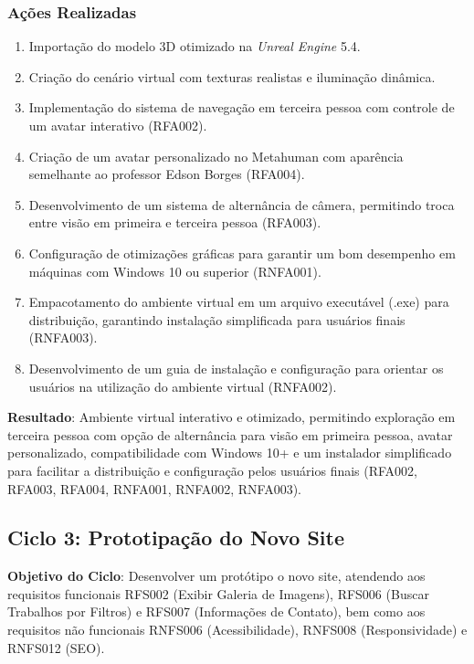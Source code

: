 \subsubsection*{Ações Realizadas}
\begin{enumerate}
    \item Importação do modelo 3D otimizado na \textit{Unreal Engine} 5.4.
    \item Criação do cenário virtual com texturas realistas e iluminação dinâmica.
    \item Implementação do sistema de navegação em terceira pessoa com controle de um avatar interativo (RFA002).
    \item Criação de um avatar personalizado no Metahuman com aparência semelhante ao professor Edson Borges (RFA004).
    \item Desenvolvimento de um sistema de alternância de câmera, permitindo troca entre visão em primeira e terceira pessoa (RFA003).
    \item Configuração de otimizações gráficas para garantir um bom desempenho em máquinas com Windows 10 ou superior (RNFA001).
    \item Empacotamento do ambiente virtual em um arquivo executável (.exe) para distribuição, garantindo instalação simplificada para usuários finais (RNFA003).
    \item Desenvolvimento de um guia de instalação e configuração para orientar os usuários na utilização do ambiente virtual (RNFA002).
\end{enumerate}

\textbf{Resultado}: Ambiente virtual interativo e otimizado, permitindo exploração em terceira pessoa com opção de alternância para visão em primeira pessoa, avatar personalizado, compatibilidade com Windows 10+ e um instalador simplificado para facilitar a distribuição e configuração pelos usuários finais (RFA002, RFA003, RFA004, RNFA001, RNFA002, RNFA003).

\subsection*{Ciclo 3: Prototipação do Novo Site} \label{subsec:ciclo3}

\textbf{Objetivo do Ciclo}: Desenvolver um protótipo o novo site, atendendo aos requisitos funcionais RFS002 (Exibir Galeria de Imagens), RFS006 (Buscar Trabalhos por Filtros) e RFS007 (Informações de Contato), bem como aos requisitos não funcionais RNFS006 (Acessibilidade), RNFS008 (Responsividade) e RNFS012 (SEO).

